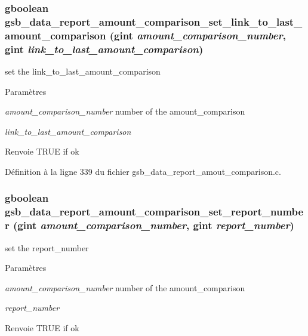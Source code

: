 \subsubsection[{gsb\_\-data\_\-report\_\-amount\_\-comparison\_\-set\_\-link\_\-to\_\-last\_\-amount\_\-comparison}]{\setlength{\rightskip}{0pt plus 5cm}gboolean gsb\_\-data\_\-report\_\-amount\_\-comparison\_\-set\_\-link\_\-to\_\-last\_\-amount\_\-comparison (gint {\em amount\_\-comparison\_\-number}, \/  gint {\em link\_\-to\_\-last\_\-amount\_\-comparison})}\label{gsb__data__report__amout__comparison_8h_ab8f7b5f344f111a9b4aee3715c2c3935}
set the link\_\-to\_\-last\_\-amount\_\-comparison


\begin{DoxyParams}{Paramètres}
\item[{\em amount\_\-comparison\_\-number}]number of the amount\_\-comparison \item[{\em link\_\-to\_\-last\_\-amount\_\-comparison}]\end{DoxyParams}
\begin{DoxyReturn}{Renvoie}
TRUE if ok 
\end{DoxyReturn}


Définition à la ligne 339 du fichier gsb\_\-data\_\-report\_\-amout\_\-comparison.c.

\subsubsection[{gsb\_\-data\_\-report\_\-amount\_\-comparison\_\-set\_\-report\_\-number}]{\setlength{\rightskip}{0pt plus 5cm}gboolean gsb\_\-data\_\-report\_\-amount\_\-comparison\_\-set\_\-report\_\-number (gint {\em amount\_\-comparison\_\-number}, \/  gint {\em report\_\-number})}\label{gsb__data__report__amout__comparison_8h_ab8582868812aa6de911a6c955057fbd2}
set the report\_\-number


\begin{DoxyParams}{Paramètres}
\item[{\em amount\_\-comparison\_\-number}]number of the amount\_\-comparison \item[{\em report\_\-number}]\end{DoxyParams}
\begin{DoxyReturn}{Renvoie}
TRUE if ok 
\end{DoxyReturn}


